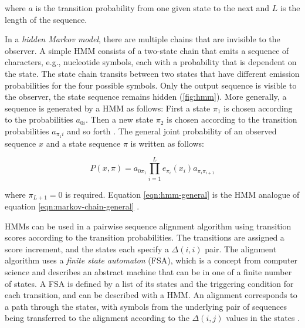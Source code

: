 where $a$ is the transition probability from one given state to the next and $L$
is the length of the sequence.

In a \emph{hidden Markov model}, there are multiple chains that are invisible to the
observer. A simple HMM consists of a two-state chain that emits a sequence of
characters, e.g., nucleotide symbols, each with a probability that is dependent
on the state. The state chain transits between two states that have different
emission probabilities for the four possible symbols. Only the output sequence
is visible to the observer, the state sequence remains hidden
(\autoref{fig:hmm}). More generally, a sequence is generated by a HMM as
follows: First a state $\pi_1$ is chosen according to the probabilities $a_{0i}$.
Then a new state $\pi_2$ is chosen according to the transition probabilities
$a_{\pi_{1}i}$ and so forth \citep{durbin1998}. The general joint probability of
an observed sequence $x$ and a state sequence $\pi$ is written as follows:

\begin{equation}
P(x,\pi) = a_{0\pi_1} \prod_{i=1}^L e_{\pi_i}(x_i)a_{\pi_i\pi_{i+1}}
\label{eqn:hmm-general}
\end{equation}

where $\pi_{L+1} = 0$ is required. Equation \eqref{eqn:hmm-general} is the HMM
analogue of equation \eqref{eqn:markov-chain-general} \citep{durbin1998}.



HMMs can be used in a pairwise sequence alignment algorithm using transition
scores according to the transition probabilities. The transitions are assigned a
score increment, and the states each specify a $\Delta(i,i)$ pair. The alignment
algorithm uses a \emph{finite state automaton} (FSA), which is a concept from
computer science and describes an abstract machine that can be in one of a
finite number of states. A FSA is defined by a list of its states and the
triggering condition for each transition, and can be described with a HMM. An
alignment corresponds to a path through the states, with symbols from the
underlying pair of sequences being transferred to the alignment according to the
$\Delta(i,j)$ values in the states \citep{durbin1998}.
